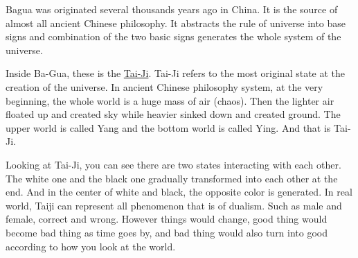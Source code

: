 \documentclass[]{book}
\theoremstyle{definition}
\theoremstyle{definition}
\theoremstyle{remark}
\begin{document}
Bagua was originated several thousands years ago in China. It is the
source of almost all ancient Chinese philosophy. It abstracts the rule
of universe into base signs and combination of the two basic signs
generates the whole system of the universe.

Inside Ba-Gua, these is the
\href{http://en.wikipedia.org/wiki/Taiji_(philosophy)}{Tai-Ji}. Tai-Ji
refers to the most original state at the creation of the universe. In
ancient Chinese philosophy system, at the very beginning, the whole
world is a huge mass of air (chaos). Then the lighter air floated up and
created sky while heavier sinked down and created ground. The upper
world is called Yang and the bottom world is called Ying. And that is
Tai-Ji.

Looking at Tai-Ji, you can see there are two states interacting with
each other. The white one and the black one gradually transformed into
each other at the end. And in the center of white and black, the
opposite color is generated. In real world, Taiji can represent all
phenomenon that is of dualism. Such as male and female, correct and
wrong. However things would change, good thing would become bad thing as
time goes by, and bad thing would also turn into good according to how
you look at the world.
\end{document}
